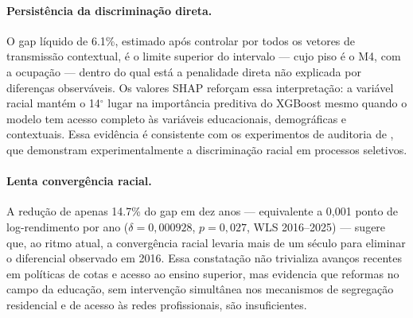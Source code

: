 \documentclass[12pt, a4paper, oneside]{article}
\begin{document}
\paragraph{Persistência da discriminação direta.}
O gap líquido de 6.1\%, estimado após controlar por todos os vetores
de transmissão contextual, é o limite superior do intervalo --- cujo piso é o
M4, com a ocupação --- dentro do qual está a penalidade direta não explicada por
diferenças observáveis. Os valores SHAP reforçam essa
interpretação: a variável racial mantém o 14$^\circ$ lugar
na importância preditiva do XGBoost mesmo quando o modelo tem acesso
completo às variáveis educacionais, demográficas e contextuais.
Essa evidência é consistente com os experimentos de auditoria de
, que demonstram experimentalmente a discriminação
racial em processos seletivos.

\paragraph{Lenta convergência racial.}
A redução de apenas 14.7\%
do gap em dez anos --- equivalente a 0,001 ponto de log-rendimento por ano
($\delta = 0{,}000928$, $p = 0{,}027$, WLS 2016--2025)
--- sugere que, ao ritmo atual, a convergência racial levaria mais de um
século para eliminar o diferencial observado em 2016.
Essa constatação não trivializa avanços recentes em políticas de cotas
e acesso ao ensino superior, mas evidencia que reformas no campo da
educação, sem intervenção simultânea nos mecanismos de segregação
residencial e de acesso às redes profissionais, são insuficientes.
\end{document}
